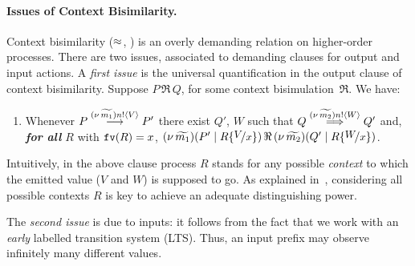 

\paragraph{Issues of Context Bisimilarity.}
Context bisimilarity ($\approx$, ) is an overly demanding relation on higher-order processes. 
There are two issues, associated to demanding clauses for output and input actions. 
A \emph{first issue} %
is 
the universal quantification in the output clause of context bisimilarity.
Suppose $P \,\Re\, Q$, for some context bisimulation~$\Re$. We have:
\begin{enumerate}[$(\star)$]
	\item	Whenever 
		$P \stackrel{(\nu\, \widetilde{m_1}) n ! \langle V \rangle}{\longrightarrow} P'$
		there exist
		$Q'$, $W$
		such that 
		$Q \stackrel{(\nu\, \widetilde{m_2}) n ! \langle W \rangle}{\Longrightarrow} Q'$
		and, \\ \emph{\textbf{for all} $R$}  with $\mathtt{fv}(R)=x$, 
		$\newsp{\widetilde{m_1}}{P' \Par R\subst{V}{x}} \,\Re\, \newsp{\widetilde{m_2}}{Q' \Par R\subst{W}{x}}$.
\end{enumerate}
Intuitively, 
in the above clause process $R$ stands for any possible \emph{context} to which the emitted value
($V$ and $W$) is supposed to go. 
As explained in~\cite{San96H}, considering 
all possible contexts $R$ is key to achieve an adequate distinguishing power.

The \emph{second issue} is due to inputs: it  
follows from 
the fact that we work with an \emph{early}
labelled transition system (LTS). Thus, %
an input prefix may observe
infinitely many different values.

